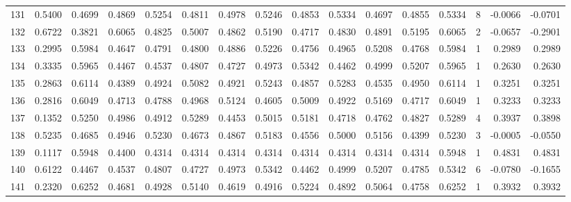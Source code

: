 \begin{tabular}{lrrrrrrrrrrrrrrr}
131 &      0.5400 &  0.4699 &  0.4869 &  0.5254 &  0.4811 &  0.4978 &  0.5246 &  0.4853 &  0.5334 &  0.4697 &   0.4855 &     0.5334 &      8 &                   -0.0066 &                    -0.0701 \\
132 &      0.6722 &  0.3821 &  0.6065 &  0.4825 &  0.5007 &  0.4862 &  0.5190 &  0.4717 &  0.4830 &  0.4891 &   0.5195 &     0.6065 &      2 &                   -0.0657 &                    -0.2901 \\
133 &      0.2995 &  0.5984 &  0.4647 &  0.4791 &  0.4800 &  0.4886 &  0.5226 &  0.4756 &  0.4965 &  0.5208 &   0.4768 &     0.5984 &      1 &                    0.2989 &                     0.2989 \\
134 &      0.3335 &  0.5965 &  0.4467 &  0.4537 &  0.4807 &  0.4727 &  0.4973 &  0.5342 &  0.4462 &  0.4999 &   0.5207 &     0.5965 &      1 &                    0.2630 &                     0.2630 \\
135 &      0.2863 &  0.6114 &  0.4389 &  0.4924 &  0.5082 &  0.4921 &  0.5243 &  0.4857 &  0.5283 &  0.4535 &   0.4950 &     0.6114 &      1 &                    0.3251 &                     0.3251 \\
136 &      0.2816 &  0.6049 &  0.4713 &  0.4788 &  0.4968 &  0.5124 &  0.4605 &  0.5009 &  0.4922 &  0.5169 &   0.4717 &     0.6049 &      1 &                    0.3233 &                     0.3233 \\
137 &      0.1352 &  0.5250 &  0.4986 &  0.4912 &  0.5289 &  0.4453 &  0.5015 &  0.5181 &  0.4718 &  0.4762 &   0.4827 &     0.5289 &      4 &                    0.3937 &                     0.3898 \\
138 &      0.5235 &  0.4685 &  0.4946 &  0.5230 &  0.4673 &  0.4867 &  0.5183 &  0.4556 &  0.5000 &  0.5156 &   0.4399 &     0.5230 &      3 &                   -0.0005 &                    -0.0550 \\
139 &      0.1117 &  0.5948 &  0.4400 &  0.4314 &  0.4314 &  0.4314 &  0.4314 &  0.4314 &  0.4314 &  0.4314 &   0.4314 &     0.5948 &      1 &                    0.4831 &                     0.4831 \\
140 &      0.6122 &  0.4467 &  0.4537 &  0.4807 &  0.4727 &  0.4973 &  0.5342 &  0.4462 &  0.4999 &  0.5207 &   0.4785 &     0.5342 &      6 &                   -0.0780 &                    -0.1655 \\
141 &      0.2320 &  0.6252 &  0.4681 &  0.4928 &  0.5140 &  0.4619 &  0.4916 &  0.5224 &  0.4892 &  0.5064 &   0.4758 &     0.6252 &      1 &                    0.3932 &                     0.3932 \\

\end{tabular}
